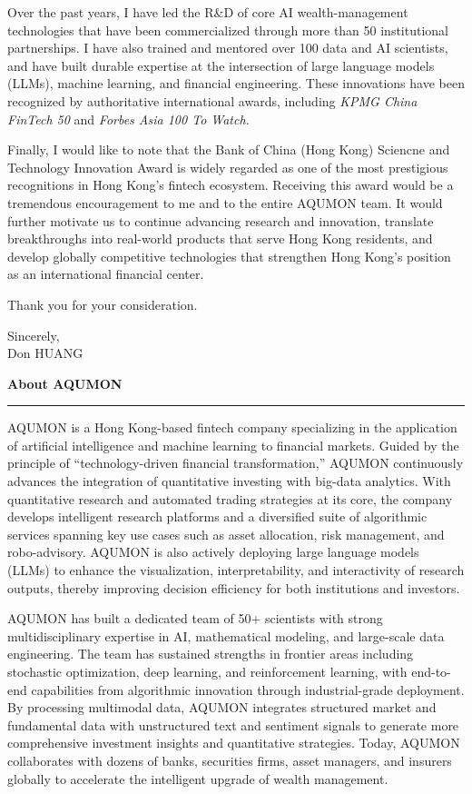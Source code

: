 \documentclass[11pt]{article}
\newcommand{\CVSection}[1]{\vspace{6pt}\textbf{\large #1}\par\vspace{2pt}\hrule\vspace{6pt}}
\newcommand{\ApplicantName}{Don HUANG}
\begin{document}
Over the past years, I have led the R\&D of core AI wealth-management technologies that have been commercialized through more than 50 institutional partnerships. I have also trained and mentored over 100 data and AI scientists, and have built durable expertise at the intersection of large language models (LLMs), machine learning, and financial engineering. These innovations have been recognized by authoritative international awards, including \emph{KPMG China FinTech 50} and \emph{Forbes Asia 100 To Watch}.

Finally, I would like to note that the Bank of China (Hong Kong) Sciencne and Technology Innovation Award is widely regarded as one of the most prestigious recognitions in Hong Kong’s fintech ecosystem. Receiving this award would be a tremendous encouragement to me and to the entire AQUMON team. It would further motivate us to continue advancing research and innovation, translate breakthroughs into real-world products that serve Hong Kong residents, and develop globally competitive technologies that strengthen Hong Kong’s position as an international financial center.

Thank you for your consideration.

Sincerely,\\[10pt]
\ApplicantName

\CVSection{About AQUMON}

AQUMON is a Hong Kong-based fintech company specializing in the application of artificial intelligence and machine learning to financial markets. Guided by the principle of “technology-driven financial transformation,” AQUMON continuously advances the integration of quantitative investing with big-data analytics. With quantitative research and automated trading strategies at its core, the company develops intelligent research platforms and a diversified suite of algorithmic services spanning key use cases such as asset allocation, risk management, and robo-advisory. AQUMON is also actively deploying large language models (LLMs) to enhance the visualization, interpretability, and interactivity of research outputs, thereby improving decision efficiency for both institutions and investors.

AQUMON has built a dedicated team of 50+ scientists with strong multidisciplinary expertise in AI, mathematical modeling, and large-scale data engineering. The team has sustained strengths in frontier areas including stochastic optimization, deep learning, and reinforcement learning, with end-to-end capabilities from algorithmic innovation through industrial-grade deployment. By processing multimodal data, AQUMON integrates structured market and fundamental data with unstructured text and sentiment signals to generate more comprehensive investment insights and quantitative strategies. Today, AQUMON collaborates with dozens of banks, securities firms, asset managers, and insurers globally to accelerate the intelligent upgrade of wealth management.
\end{document}
